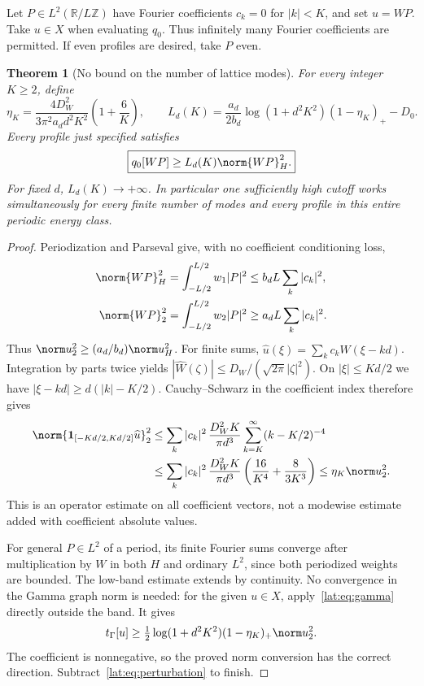 \documentclass[11pt,a4paper]{article}
\numberwithin{equation}{section}
\newtheorem{theorem}{Theorem}[section]
\theoremstyle{definition}\newtheorem{definition}[theorem]{Definition}
\theoremstyle{remark}\newtheorem{remark}[theorem]{Remark}
\newcommand{\R}{\mathbb R}\newcommand{\C}{\mathbb C}\newcommand{\N}{\mathbb N}
\begin{document}
Let $P\in L^2(\R/L\mathbb Z)$ have Fourier coefficients $c_k=0$ for
$|k|<K$, and set $u=WP$. Take $u\in X$ when evaluating $q_0$.
Thus infinitely many Fourier coefficients are permitted.
If even profiles are desired, take $P$ even.

\begin{theorem}[No bound on the number of lattice modes]\label{lat:thm:lattice}
For every integer $K\ge2$, define
\[
 \eta_K=\frac{4D_W^2}{3\pi^2a_dd^2K^2}\left(1+\frac6K\right),
 \qquad
 L_d(K)=\frac{a_d}{2b_d}\log(1+d^2K^2)(1-\eta_K)_+-D_0.
\]
Every profile just specified satisfies
\begin{equation}\label{lat:eq:lattice}
 \boxed{q_0[WP]\ge L_d(K)\norm{WP}_H^2.}
\end{equation}
For fixed $d$, $L_d(K)\to+\infty$. In particular one sufficiently high
cutoff works simultaneously for every finite number of modes and every
profile in this entire periodic energy class.
\end{theorem}
\begin{proof}
Periodization and Parseval give, with no coefficient conditioning loss,
\begin{align*}
 \norm{WP}_H^2&=\int_{-L/2}^{L/2}w_1|P|^2
                       \le b_dL\sum_k|c_k|^2,\\
 \norm{WP}_2^2&=\int_{-L/2}^{L/2}w_2|P|^2
                       \ge a_dL\sum_k|c_k|^2.
\end{align*}
Thus $\norm u_2^2\ge(a_d/b_d)\norm u_H^2$.
For finite sums, $\widehat u(\xi)=\sum_kc_k\widehat W(\xi-kd)$.
Integration by parts twice yields
$|\widehat W(\zeta)|\le D_W/(\sqrt{2\pi}|\zeta|^2)$.
On $|\xi|\le Kd/2$ we have $|\xi-kd|\ge d(|k|-K/2)$.
Cauchy--Schwarz in the coefficient index therefore gives
\begin{align*}
 \norm{\mathbf1_{[-Kd/2,Kd/2]}\widehat u}_2^2
 &\le\sum_k|c_k|^2\,
 \frac{D_W^2K}{\pi d^3}\sum_{k=K}^\infty(k-K/2)^{-4}\\
 &\le\sum_k|c_k|^2\,
 \frac{D_W^2K}{\pi d^3}
              \left(\frac{16}{K^4}+\frac8{3K^3}\right)
 \le\eta_K\norm u_2^2.
\end{align*}
This is an operator estimate on all coefficient vectors, not a modewise
estimate added with coefficient absolute values.

For general $P\in L^2$ of a period, its finite Fourier sums converge
after multiplication by $W$ in both $H$ and ordinary $L^2$, since both
periodized weights are bounded. The low-band estimate extends by continuity.
No convergence in the Gamma graph norm is needed: for the given $u\in X$,
apply~\eqref{lat:eq:gamma} directly outside the band. It gives
\[
 t_\Gamma[u]\ge\tfrac12\log(1+d^2K^2)
                         (1-\eta_K)_+\norm u_2^2.
\]
The coefficient is nonnegative, so the proved norm conversion has the
correct direction. Subtract~\eqref{lat:eq:perturbation} to finish.
\end{proof}
\end{document}
